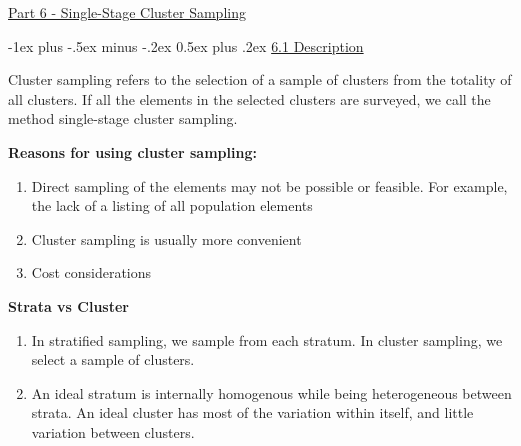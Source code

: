 \documentclass[10pt,landscape]{article}
\makeatletter
\renewcommand{\section}{\@startsection{section}{1}{0mm}%
                                {-1ex plus -.5ex minus -.2ex}%
                                {0.5ex plus .2ex}%
                                {\normalfont\large\bfseries}}
\makeatother
\begin{document}
\raggedright
\footnotesize
\begin{multicols}{3}


\setlength{\premulticols}{1pt}
\setlength{\postmulticols}{1pt}
\setlength{\multicolsep}{1pt}
\setlength{\columnsep}{2pt}

\begin{center}
     \Large{\underline{Part 6 - Single-Stage Cluster Sampling}} \\
\end{center}

\section{\underline{6.1 Description}}

Cluster sampling refers to the selection of a sample of clusters from the totality of all clusters. If all the elements in the selected clusters are surveyed, we call the method single-stage cluster sampling.

\textbf{Reasons for using cluster sampling:}
\begin{enumerate}
  \item Direct sampling of the elements may not be possible or feasible. For example, the lack of a listing of all population elements
  \item Cluster sampling is usually more convenient
  \item Cost considerations
\end{enumerate}

\textbf{Strata vs Cluster}
\begin{enumerate}
  \item In stratified sampling, we sample from each stratum. In cluster sampling, we select a sample of clusters.
  \item An ideal stratum is internally homogenous while being heterogeneous between strata. An ideal cluster has most of the variation within itself, and little variation between clusters.
\end{enumerate}


\end{multicols}
\end{document}
